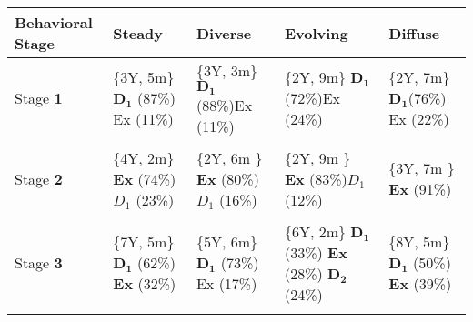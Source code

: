 \documentclass[10pt,letterpaper]{article}
\begin{document}
\begin{table}%
	\begin{tabular}{p{30mm} p{15mm} p{15mm} p{15mm} p{15mm}@{}}
		\toprule
		\textbf{Behavioral Stage}  & \textbf{Steady} & \textbf{Diverse} & \textbf{Evolving} & \textbf{Diffuse} \\
		\midrule
		Stage \textbf{1}& \{3Y, 5m\} \newline $\mathbf{D_1}$ (87\%) \newline Ex (11\%) &
		\{3Y, 3m\} \newline $\mathbf{D_1}$ (88\%)\newline Ex (11\%)&
		\{2Y, 9m\} \newline $\mathbf{D_1}$ (72\%)\newline Ex (24\%) &
		\{2Y, 7m\} \newline $\mathbf{D_1}$(76\%) \newline Ex (22\%) \\\\
		Stage \textbf{2} &  \{4Y, 2m\} \newline \textbf{Ex} (74\%)\newline ${D_1}$ (23\%) &
		\{2Y, 6m \} \newline \textbf{Ex} (80\%)\newline ${D_1}$ (16\%) &
		\{2Y, 9m \} \newline \textbf{Ex} (83\%)\newline ${D_1}$ (12\%) &
		\{3Y, 7m \} \newline \textbf{Ex} (91\%) \\\\
		Stage \textbf{3} & \{7Y, 5m\} \newline $\mathbf{D_1}$ (62\%) \newline \textbf{Ex} (32\%)  &
		\{5Y, 6m\} \newline $\mathbf{D_1}$ (73\%) \newline Ex (17\%) &
		\{6Y, 2m\} \newline $\mathbf{D_1}$ (33\%) \newline \textbf{Ex} (28\%) \newline $\mathbf{D_2}$ (24\%)&
		\{8Y, 5m\} \newline $\mathbf{D_1}$ (50\%) \newline \textbf{Ex} (39\%) \\\\

\end{tabular}
\end{table}
\end{document}
